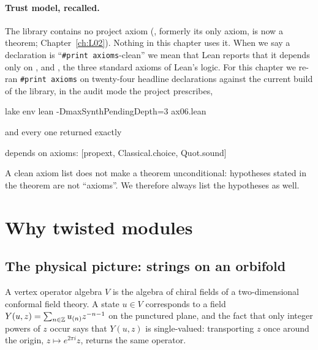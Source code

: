 \paragraph{Trust model, recalled.}  The library contains no project
axiom (, formerly its only axiom, is now a theorem; Chapter~\ref{ch:L02}).  Nothing in
this chapter uses it.  When we say a declaration
is ``\texttt{\#print axioms}-clean'' we mean that Lean reports that it depends only on
,  and , the three standard axioms of Lean's
logic.  For this chapter we re-ran \texttt{\#print axioms} on twenty-four headline declarations
against the current build of the library, in the audit mode the project prescribes,
\begin{plaincode}
lake env lean -DmaxSynthPendingDepth=3 ax06.lean
\end{plaincode}
and every one returned exactly
\begin{plaincode}
depends on axioms: [propext, Classical.choice, Quot.sound]
\end{plaincode}
A clean axiom list does not make a theorem unconditional: hypotheses stated in the theorem are not
``axioms''.  We therefore always list the hypotheses as well.

\section{Why twisted modules}\label{ch06:sec:why}

\subsection{The physical picture: strings on an orbifold}

A vertex operator algebra $V$ is the algebra of chiral fields of a two-dimensional conformal field
theory.  A state $u\in V$ corresponds to a field $Y(u,z)=\sum_{n\in{\mathbb{Z}}}u_{(n)}z^{-n-1}$ on the
punctured plane, and the fact that only integer powers of $z$ occur says that $Y(u,z)$ is
single-valued: transporting $z$ once around the origin, $z\mapsto e^{2\pi i}z$, returns the same
operator.

